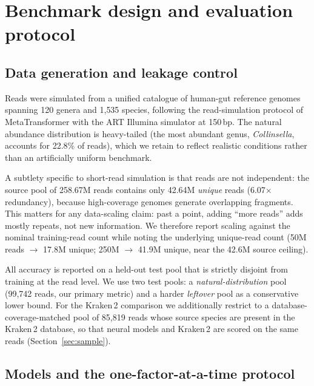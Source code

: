 \section{Benchmark design and evaluation protocol}
\label{sec:design}

\subsection{Data generation and leakage control}

Reads were simulated from a unified catalogue of human-gut reference genomes
\citep{Almeida2019} spanning 120 genera and 1{,}535 species, following the
read-simulation protocol of MetaTransformer \citep{Wichmann2023} with the ART
Illumina simulator \citep{Huang2012} at 150\,bp. The natural abundance
distribution is heavy-tailed (the most abundant genus, \emph{Collinsella},
accounts for 22.8\% of reads), which we retain to reflect realistic conditions
rather than an artificially uniform benchmark.

A subtlety specific to short-read simulation is that reads are not independent:
the source pool of 258.67M reads contains only 42.64M \emph{unique} reads
(6.07$\times$ redundancy), because high-coverage genomes generate overlapping
fragments. This matters for any data-scaling claim: past a point, adding
``more reads'' adds mostly repeats, not new information. We therefore report
scaling against the nominal training-read count while noting the underlying
unique-read count (50M reads $\rightarrow$ 17.8M unique; 250M $\rightarrow$
41.9M unique, near the 42.6M source ceiling).

All accuracy is reported on a held-out test pool that is strictly disjoint
from training at the read level. We use two test pools: a
\emph{natural-distribution} pool (99{,}742 reads, our primary metric) and a
harder \emph{leftover} pool as a conservative lower bound. For the Kraken\,2
comparison we additionally restrict to a database-coverage-matched pool of
85{,}819 reads whose source species are present in the Kraken\,2 database, so
that neural models and Kraken\,2 are scored on the same reads
(Section~\ref{sec:sample}).

\subsection{Models and the one-factor-at-a-time protocol}

